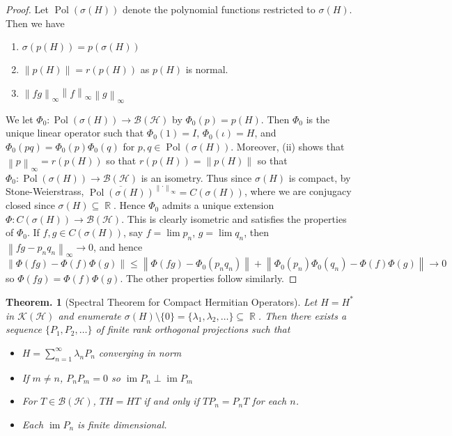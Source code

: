\documentclass[11pt, a4paper]{memoir}
\DeclareMathOperator{\R}{{\mathbb{R}}}
\newcommand{\norm}[1]{\ensuremath{\left\lVert#1\right\rVert}}
\theoremstyle{change}
\newtheorem{theorem}{Theorem.}[section]
\theoremstyle{plain}
\theoremstyle{nonumberplain}
\newtheorem{proof}{Proof}
\DeclareMathOperator{\im}{im}
\DeclareMathOperator{\Pol}{Pol}
\numberwithin{equation}{section}
\begin{document}
\begin{proof}
    Let $\Pol(\sigma(H))$ denote the polynomial functions restricted to $\sigma(H)$.
    Then we have
    \begin{enumerate}[nl,r]
        \item $\sigma(p(H))=p(\sigma(H))$
        \item $\norm{p(H)}=r(p(H))$ as $p(H)$ is normal.
        \item $\norm{fg}_\infty\norm{f}_\infty\norm{g}_\infty$
    \end{enumerate}
    We let $\Phi_0:\Pol(\sigma(H))\to\mathcal{B}(\mathcal{H})$ by $\Phi_0(p)=p(H)$.
    Then $\Phi_0$ is the unique linear operator such that $\Phi_0(1)=I$, $\Phi_0(\iota)=H$, and $\Phi_0(pq)=\Phi_0(p)\Phi_0(q)$ for $p,q\in\Pol(\sigma(H))$.
    Moreover, (ii) shows that $\norm{p}_\infty=r(p(H))$ so that $r(p(H))=\norm{p(H)}$ so that $\Phi_0:\Pol(\sigma(H))\to\mathcal{B}(\mathcal{H})$ is an isometry.
    Thus since $\sigma(H)$ is compact, by Stone-Weierstrass, $\overline{\Pol(\sigma(H))}^{\norm{\cdot}_\infty}=C(\sigma(H))$, where we are conjugacy closed since $\sigma(H)\subseteq\R$.
    Hence $\Phi_0$ admits a unique extension $\Phi:C(\sigma(H))\to\mathcal{B}(\mathcal{H})$.
    This is clearly isometric and satisfies the properties of $\Phi_0$.
    If $f,g\in C(\sigma(H))$, say $f=\lim p_n$, $g=\lim q_n$, then $\norm{fg-p_nq_n}_\infty\to 0$, and hence
    \begin{equation*}
        \norm{\Phi(fg)-\Phi(f)\Phi(g)}\leq\norm{\Phi(fg)-\Phi_0(p_nq_n)}+\norm{\Phi_0(p_n)\Phi_0(q_n)-\Phi(f)\Phi(g)}\to 0
    \end{equation*}
    so $\Phi(fg)=\Phi(f)\Phi(g)$.
    The other properties follow similarly.
\end{proof}
\begin{theorem}[Spectral Theorem for Compact Hermitian Operators]
    Let $H=H^*$ in $\mathcal{K}(\mathcal{H})$ and enumerate $\sigma(H)\setminus\{0\}=\{\lambda_1,\lambda_2,\ldots\}\subseteq\R$.
    Then there exists a sequence $\{P_1,P_2,\ldots\}$ of finite rank orthogonal projections such that
    \begin{itemize}[nl]
        \item $H=\sum_{n=1}^\infty\lambda_n P_n$ converging in norm
        \item If $m\neq n$, $P_nP_m=0$ so $\im P_n\perp\im P_m$
        \item For $T\in\mathcal{B}(\mathcal{H})$, $TH=HT$ if and only if $TP_n=P_nT$ for each $n$.
        \item Each $\im P_n$ is finite dimensional.
    \end{itemize}
\end{theorem}
\end{document}
